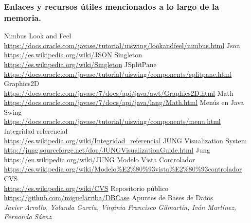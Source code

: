 \begin{thebibliography}{9}
\subsubsection*{Enlaces y recursos útiles mencionados a lo largo de la memoria.}

Nimbus Look and Feel
\\\url{https://docs.oracle.com/javase/tutorial/uiswing/lookandfeel/nimbus.html}
Json
\\\url{https://es.wikipedia.org/wiki/JSON}
Singleton
\\\url{https://es.wikipedia.org/wiki/Singleton}
JSplitPane
\\\url{https://docs.oracle.com/javase/tutorial/uiswing/components/splitpane.html}
Graphics2D
\\\url{https://docs.oracle.com/javase/7/docs/api/java/awt/Graphics2D.html}
Math
\\\url{https://docs.oracle.com/javase/7/docs/api/java/lang/Math.html}
Menús en Java Swing
\\\url{https://docs.oracle.com/javase/tutorial/uiswing/components/menu.html}
Integridad referencial
\\\url{https://es.wikipedia.org/wiki/Integridad_referencial}
JUNG Visualization System
\\\url{http://jung.sourceforge.net/doc/JUNGVisualizationGuide.html}
Jung
\\\url{https://en.wikipedia.org/wiki/JUNG}
Modelo Vista Controlador
\\\url{https://es.wikipedia.org/wiki/Modelo\%E2\%80\%93vista\%E2\%80\%93controlador}
CVS
\\\url{https://es.wikipedia.org/wiki/CVS}
Repositorio público
\\\url{https://github.com/miguelarriba/DBCase}
\bibitem{} 
Apuntes de Bases de Datos\\
\textit{Javier Arrollo, Yolanda García, Virginia Francisco Gilmartín, Iván Martínez, Fernando Sáenz}
\end{thebibliography}
